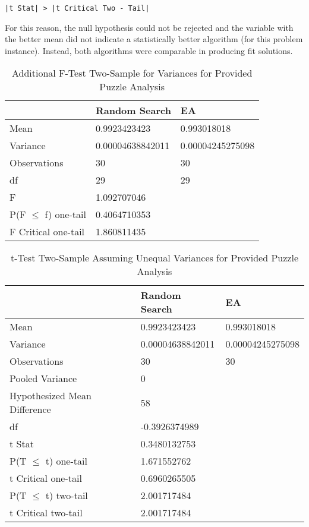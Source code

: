 \documentclass[11pt]{article}
\begin{document}
\begin{center}
\texttt{|t Stat| > |t Critical Two - Tail|}
\end{center}

For this reason, the null hypothesis could not be rejected and the variable with the better mean did not indicate a statistically better algorithm (for this problem instance). Instead, both algorithms were comparable in producing fit solutions.


\begin{table}[H]
\centering
\caption{Additional F-Test Two-Sample for Variances for Provided Puzzle Analysis}
\label{bonus_table1}
\begin{tabular}{l|l|l}
 & Random Search & EA \\ \hline
Mean & 0.9923423423 & 0.993018018 \\
Variance & 0.00004638842011 & 0.00004245275098 \\
Observations & 30 & 30 \\
df & 29 & 29 \\
F & 1.092707046 &  \\
P(F $\leq$ f) one-tail & 0.4064710353 &  \\
F Critical one-tail & 1.860811435 & 
\end{tabular}
\end{table}

\begin{table}[H]
\centering
\caption{t-Test Two-Sample Assuming Unequal Variances for Provided Puzzle Analysis}
\label{bonus_table2}
\begin{tabular}{l|l|l}
 & Random Search & EA \\ \hline
Mean & 0.9923423423 & 0.993018018 \\
Variance & 0.00004638842011 & 0.00004245275098 \\
Observations & 30 & 30 \\
Pooled Variance & 0 &  \\
Hypothesized Mean Difference & 58 &  \\
df & -0.3926374989 &  \\
t Stat & 0.3480132753 &  \\
P(T $\leq$ t) one-tail & 1.671552762 &  \\
t Critical one-tail & 0.6960265505 &  \\
P(T $\leq$ t) two-tail & 2.001717484 &  \\
t Critical two-tail & 2.001717484 & 
\end{tabular}
\end{table}
\end{document}
